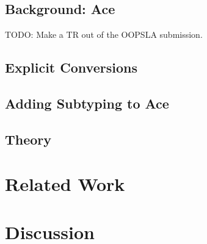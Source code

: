 \documentclass{acm_proc_article-sp}
\theoremstyle{definition}
\begin{document}
\subsection{Background: Ace}
TODO: Make a TR out of the OOPSLA submission.
\subsection{Explicit Conversions}
\subsection{Adding Subtyping to Ace}
\subsection{Theory}

\section{Related Work}

\section{Discussion}






\end{document}
